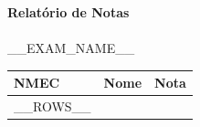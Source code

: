 \documentclass[a4paper,11pt]{article}
\begin{document}
\begin{center}
    {\huge \textbf{Relatório de Notas}} \\
    \vspace{0.2cm}
    {\Large } \\
    \vspace{0.1cm}
    {\large __EXAM_NAME__} \\
    
\end{center}

\vspace{0.5cm}

\begin{longtable}{|l|p{8cm}|r|}
\hline
\textbf{NMEC} & \textbf{Nome} & \textbf{Nota} \\
\hline
\endhead

__ROWS__

\end{longtable}
\end{document}
